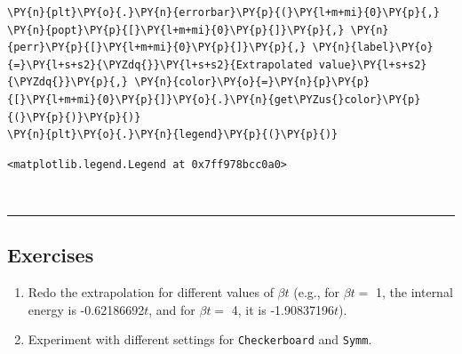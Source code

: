 \begin{tcolorbox}[breakable, size=fbox, boxrule=1pt, pad at break*=1mm,colback=cellbackground, colframe=cellborder]
\begin{Verbatim}[commandchars=\\\{\}]
\PY{n}{plt}\PY{o}{.}\PY{n}{errorbar}\PY{p}{(}\PY{l+m+mi}{0}\PY{p}{,} \PY{n}{popt}\PY{p}{[}\PY{l+m+mi}{0}\PY{p}{]}\PY{p}{,} \PY{n}{perr}\PY{p}{[}\PY{l+m+mi}{0}\PY{p}{]}\PY{p}{,} \PY{n}{label}\PY{o}{=}\PY{l+s+s2}{\PYZdq{}}\PY{l+s+s2}{Extrapolated value}\PY{l+s+s2}{\PYZdq{}}\PY{p}{,} \PY{n}{color}\PY{o}{=}\PY{n}{p}\PY{p}{[}\PY{l+m+mi}{0}\PY{p}{]}\PY{o}{.}\PY{n}{get\PYZus{}color}\PY{p}{(}\PY{p}{)}\PY{p}{)}
\PY{n}{plt}\PY{o}{.}\PY{n}{legend}\PY{p}{(}\PY{p}{)}
\end{Verbatim}
\end{tcolorbox}

            \begin{tcolorbox}[breakable, size=fbox, boxrule=.5pt, pad at break*=1mm, opacityfill=0]
\begin{Verbatim}[commandchars=\\\{\}]
<matplotlib.legend.Legend at 0x7ff978bcc0a0>
\end{Verbatim}
\end{tcolorbox}
        
    \begin{center}
    \end{center}
    { \hspace*{\fill} \\}
    
    \begin{center}\rule{0.5\linewidth}{0.5pt}\end{center}

\hypertarget{exercises}{%
\subsection{Exercises}\label{exercises}}

\begin{enumerate}
\def\labelenumi{\arabic{enumi}.}
\tightlist
\item
  Redo the extrapolation for different values of \(\beta t\) (e.g., for
  \(\beta t =\) 1, the internal energy is -0.62186692\(t\), and for
  \(\beta t =\) 4, it is -1.90837196\(t\)).
\item
  Experiment with different settings for \texttt{Checkerboard} and
  \texttt{Symm}.
\end{enumerate}


    
    
    
